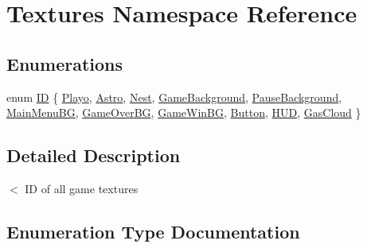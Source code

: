 \hypertarget{namespace_textures}{}\section{Textures Namespace Reference}
\label{namespace_textures}
\subsection*{Enumerations}
\begin{DoxyCompactItemize}
\item 
enum \hyperlink{namespace_textures_a2cfe2099537d4e80b08437b4978301a5}{ID} \{ \newline
\hyperlink{namespace_textures_a2cfe2099537d4e80b08437b4978301a5aa7eca1b35d39c70635eb67e8d21dc819}{Playo}, 
\hyperlink{namespace_textures_a2cfe2099537d4e80b08437b4978301a5a61cbf1132258cda586a6130a03e804c9}{Astro}, 
\hyperlink{namespace_textures_a2cfe2099537d4e80b08437b4978301a5ae0de724966274dc241ef3de7eadc396d}{Nest}, 
\hyperlink{namespace_textures_a2cfe2099537d4e80b08437b4978301a5a52aa97e3cdb226168982426b7ab0aa2d}{Game\+Background}, 
\newline
\hyperlink{namespace_textures_a2cfe2099537d4e80b08437b4978301a5aa39a5e3bca9832daaaa9cbf31b8961f9}{Pause\+Background}, 
\hyperlink{namespace_textures_a2cfe2099537d4e80b08437b4978301a5aa7d0eb38e6c55469c163efe01cb88695}{Main\+Menu\+BG}, 
\hyperlink{namespace_textures_a2cfe2099537d4e80b08437b4978301a5a24f167674de87c1108c92fffd3837cd0}{Game\+Over\+BG}, 
\hyperlink{namespace_textures_a2cfe2099537d4e80b08437b4978301a5aee47421f6d61f9f5c50d07424097fa99}{Game\+Win\+BG}, 
\newline
\hyperlink{namespace_textures_a2cfe2099537d4e80b08437b4978301a5ac583013e9c40cfacce00147270928966}{Button}, 
\hyperlink{namespace_textures_a2cfe2099537d4e80b08437b4978301a5a34760cfde35030b2a2e35c8e81d6602a}{H\+UD}, 
\hyperlink{namespace_textures_a2cfe2099537d4e80b08437b4978301a5aa9db10d857958d53d192c3165dead752}{Gas\+Cloud}
 \}
\end{DoxyCompactItemize}


\subsection{Detailed Description}
$<$ ID of all game textures 

\subsection{Enumeration Type Documentation}
\mbox{\label{namespace_textures_a2cfe2099537d4e80b08437b4978301a5}} 
